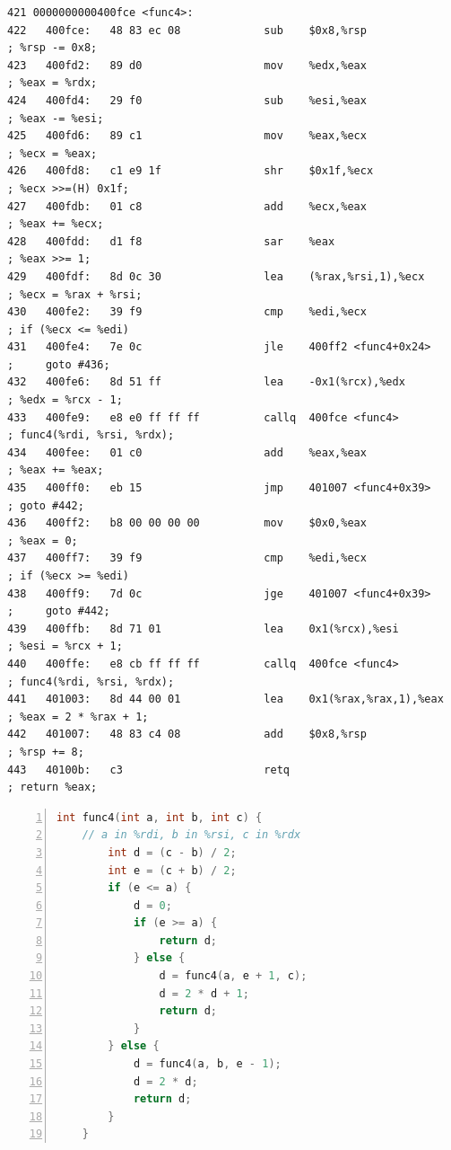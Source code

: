 \documentclass{article}
\begin{document}
\begin{lstlisting}[title = func4反汇编代码及注释, xleftmargin = 2em,xrightmargin = 2em, aboveskip = 1em, numbers = none, basicstyle=\footnotesize\ttfamily]
421 0000000000400fce <func4>:
422   400fce:   48 83 ec 08             sub    $0x8,%rsp                    ; %rsp -= 0x8;
423   400fd2:   89 d0                   mov    %edx,%eax                    ; %eax = %rdx;
424   400fd4:   29 f0                   sub    %esi,%eax                    ; %eax -= %esi;
425   400fd6:   89 c1                   mov    %eax,%ecx                    ; %ecx = %eax;
426   400fd8:   c1 e9 1f                shr    $0x1f,%ecx                   ; %ecx >>=(H) 0x1f;
427   400fdb:   01 c8                   add    %ecx,%eax                    ; %eax += %ecx;
428   400fdd:   d1 f8                   sar    %eax                         ; %eax >>= 1;
429   400fdf:   8d 0c 30                lea    (%rax,%rsi,1),%ecx           ; %ecx = %rax + %rsi;
430   400fe2:   39 f9                   cmp    %edi,%ecx                    ; if (%ecx <= %edi)
431   400fe4:   7e 0c                   jle    400ff2 <func4+0x24>          ;     goto #436;
432   400fe6:   8d 51 ff                lea    -0x1(%rcx),%edx              ; %edx = %rcx - 1;
433   400fe9:   e8 e0 ff ff ff          callq  400fce <func4>               ; func4(%rdi, %rsi, %rdx);
434   400fee:   01 c0                   add    %eax,%eax                    ; %eax += %eax;
435   400ff0:   eb 15                   jmp    401007 <func4+0x39>          ; goto #442;
436   400ff2:   b8 00 00 00 00          mov    $0x0,%eax                    ; %eax = 0;
437   400ff7:   39 f9                   cmp    %edi,%ecx                    ; if (%ecx >= %edi)
438   400ff9:   7d 0c                   jge    401007 <func4+0x39>          ;     goto #442;
439   400ffb:   8d 71 01                lea    0x1(%rcx),%esi               ; %esi = %rcx + 1;
440   400ffe:   e8 cb ff ff ff          callq  400fce <func4>               ; func4(%rdi, %rsi, %rdx);
441   401003:   8d 44 00 01             lea    0x1(%rax,%rax,1),%eax        ; %eax = 2 * %rax + 1;
442   401007:   48 83 c4 08             add    $0x8,%rsp                    ; %rsp += 8;
443   40100b:   c3                      retq                                ; return %eax;
\end{lstlisting}

\begin{lstlisting}[title = func4对应的C代码, xleftmargin = 2em,xrightmargin = 2em, aboveskip = 1em, numbers = left, language=c]
    int func4(int a, int b, int c) {
    // a in %rdi, b in %rsi, c in %rdx
        int d = (c - b) / 2;
        int e = (c + b) / 2;
        if (e <= a) {
            d = 0;
            if (e >= a) {
                return d;
            } else {
                d = func4(a, e + 1, c);
                d = 2 * d + 1;
                return d;
            }
        } else {
            d = func4(a, b, e - 1);
            d = 2 * d;
            return d;
        }
    }
\end{lstlisting}
\end{document}
